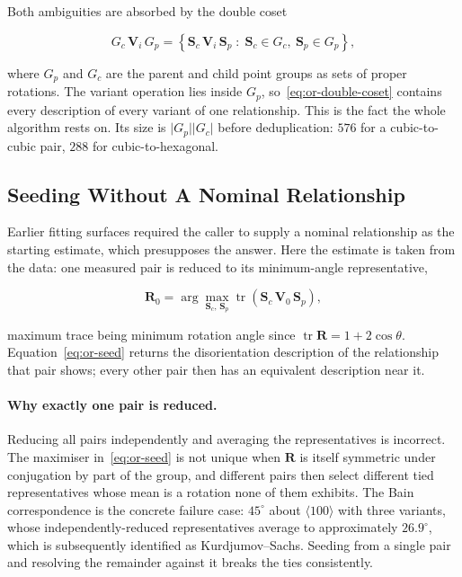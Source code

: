 Both ambiguities are absorbed by the double coset

\begin{equation}
G_{c}\,\mathbf{V}_{i}\,G_{p}
= \left\{ \mathbf{S}_{c}\,\mathbf{V}_{i}\,\mathbf{S}_{p} \;:\;
\mathbf{S}_{c} \in G_{c},\ \mathbf{S}_{p} \in G_{p} \right\},
\label{eq:or-double-coset}
\end{equation}

where $G_{p}$ and $G_{c}$ are the parent and child point groups as sets of proper rotations. The
variant operation lies inside $G_{p}$, so~\eqref{eq:or-double-coset} contains every description
of every variant of one relationship. This is the fact the whole algorithm rests on. Its size is
$\lvert G_{p}\rvert \lvert G_{c}\rvert$ before deduplication: $576$ for a cubic-to-cubic pair,
$288$ for cubic-to-hexagonal.

\subsection{Seeding Without A Nominal Relationship}

Earlier fitting surfaces required the caller to supply a nominal relationship as the starting
estimate, which presupposes the answer. Here the estimate is taken from the data: one measured
pair is reduced to its minimum-angle representative,

\begin{equation}
\mathbf{R}_{0}
= \arg\max_{\mathbf{S}_{c},\,\mathbf{S}_{p}}
\operatorname{tr}\!\left( \mathbf{S}_{c}\,\mathbf{V}_{0}\,\mathbf{S}_{p} \right),
\label{eq:or-seed}
\end{equation}

maximum trace being minimum rotation angle since $\operatorname{tr}\mathbf{R} = 1 + 2\cos\theta$.
Equation~\eqref{eq:or-seed} returns the disorientation description of the relationship that pair
shows; every other pair then has an equivalent description near it.

\paragraph{Why exactly one pair is reduced.} Reducing all pairs independently and averaging the
representatives is incorrect. The maximiser in~\eqref{eq:or-seed} is not unique when
$\mathbf{R}$ is itself symmetric under conjugation by part of the group, and different pairs then
select different tied representatives whose mean is a rotation none of them exhibits. The Bain
correspondence is the concrete failure case: $45^{\circ}$ about $\langle 100 \rangle$ with three
variants, whose independently-reduced representatives average to approximately $26.9^{\circ}$,
which is subsequently identified as Kurdjumov--Sachs. Seeding from a single pair and resolving
the remainder against it breaks the ties consistently.

